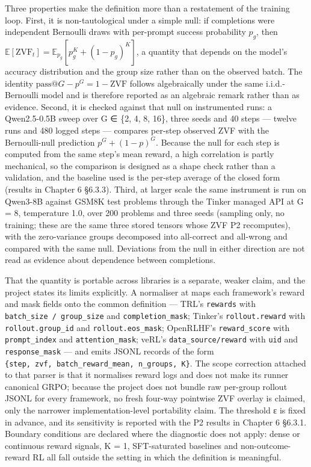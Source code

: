 \documentclass[12pt,a4paper]{report}
\newcommand{\longtok}[1]{\texttt{\seqsplit{#1}}}
\begin{document}
Three properties make the definition more than a restatement of the
training loop. First, it is non-tautological under a simple null: if
completions were independent Bernoulli draws with per-prompt success
probability \(p_g\), then
\(\mathbb{E}[\mathrm{ZVF}_t] = \mathbb{E}_{p_g}[p_g^K + (1-p_g)^K]\), a
quantity that depends on the model's accuracy distribution and the group
size rather than on the observed batch. The identity
\(\mathrm{pass@}G - p^G = 1 - \mathrm{ZVF}\) follows algebraically under
the same i.i.d.-Bernoulli model and is therefore reported as an
algebraic remark rather than as evidence. Second, it is checked against
that null on instrumented runs: a Qwen2.5-0.5B sweep over G ∈ \{2, 4, 8,
16\}, three seeds and 40 steps --- twelve runs and 480 logged steps ---
compares per-step observed ZVF with the Bernoulli-null prediction
\(p^G + (1-p)^G\). Because the null for each step is computed from the
same step's mean reward, a high correlation is partly mechanical, so the
comparison is designed as a shape check rather than a validation, and
the baseline used is the per-step average of the closed form (results in
Chapter 6 §6.3.3). Third, at larger scale the same instrument is run on
Qwen3-8B against GSM8K test problems through the Tinker managed API at G
= 8, temperature 1.0, over 200 problems and three seeds (sampling only,
no training; these are the same three stored tensors whose ZVF P2
recomputes), with the zero-variance groups decomposed into all-correct
and all-wrong and compared with the same null. Deviations from the null
in either direction are not read as evidence about dependence between
completions.

That the quantity is portable across libraries is a separate, weaker
claim, and the project states its limits explicitly. A normaliser at
\longtok{platform\_modal/scripts/zvf\_\allowbreak{}compute\_\allowbreak{}cross\_\allowbreak{}framework.py} maps
each framework's reward and mask fields onto the common definition ---
TRL's \texttt{rewards} with \texttt{batch\_size\ /\ group\_size} and
\texttt{completion\_mask}; Tinker's \texttt{rollout.reward} with
\texttt{rollout.group\_id} and \texttt{rollout.eos\_mask}; OpenRLHF's
\texttt{reward\_score} with \texttt{prompt\_index} and
\texttt{attention\_mask}; veRL's \texttt{data\_source/reward} with
\texttt{uid} and \texttt{response\_mask} --- and emits JSONL records of
the form \texttt{\{step,\allowbreak{}\ zvf,\allowbreak{}\ batch\_\allowbreak{}\allowbreak{}reward\_\allowbreak{}\allowbreak{}mean,\allowbreak{}\ n\_\allowbreak{}groups,\allowbreak{}\ K\}}.
The scope correction attached to that parser is that it normalises
reward logs and does not make its runner canonical GRPO; because the
project does not bundle raw per-group rollout JSONL for every framework,
no fresh four-way pointwise ZVF overlay is claimed, only the narrower
implementation-level portability claim. The threshold ε is fixed in
advance, and its sensitivity is reported with the P2 results in Chapter
6 §6.3.1. Boundary conditions are declared where the diagnostic does not
apply: dense or continuous reward signals, K = 1, SFT-saturated
baselines and non-outcome-reward RL all fall outside the setting in
which the definition is meaningful.
\end{document}
